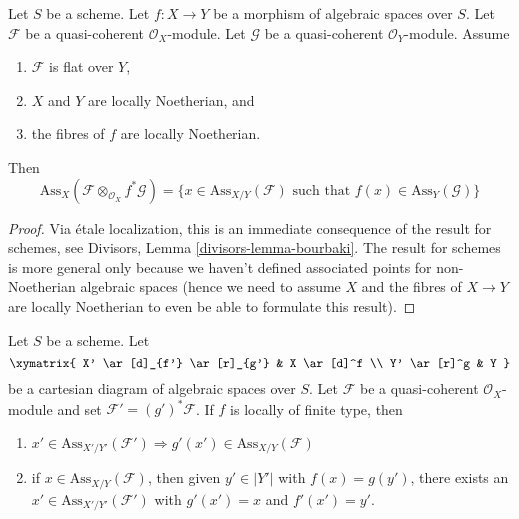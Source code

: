 \begin{lemma}
\label{lemma-bourbaki}
Let $S$ be a scheme.
Let $f : X \to Y$ be a morphism of algebraic spaces over $S$.
Let $\mathcal{F}$ be a quasi-coherent $\mathcal{O}_X$-module.
Let $\mathcal{G}$ be a quasi-coherent $\mathcal{O}_Y$-module.
Assume
\begin{enumerate}
\item $\mathcal{F}$ is flat over $Y$,
\item $X$ and $Y$ are locally Noetherian, and
\item the fibres of $f$ are locally Noetherian.
\end{enumerate}
Then
$$
\text{Ass}_X(\mathcal{F} \otimes_{\mathcal{O}_X} f^*\mathcal{G}) =
\{x \in \text{Ass}_{X/Y}(\mathcal{F})\text{ such that }
f(x) \in \text{Ass}_Y(\mathcal{G}) \}
$$
\end{lemma}

\begin{proof}
Via \'etale localization, this is an immediate consequence of the result
for schemes, see
Divisors, Lemma \ref{divisors-lemma-bourbaki}.
The result for schemes is more general only because
we haven't defined associated points for
non-Noetherian algebraic spaces (hence we need to assume $X$
and the fibres of $X \to Y$ are locally Noetherian to even
be able to formulate this result).
\end{proof}

\begin{lemma}
\label{lemma-base-change-relative-assassin}
Let $S$ be a scheme. Let
$$
\xymatrix{
X' \ar[d]_{f'} \ar[r]_{g'} & X \ar[d]^f \\
Y' \ar[r]^g & Y
}
$$
be a cartesian diagram of algebraic spaces over $S$.
Let $\mathcal{F}$ be a quasi-coherent $\mathcal{O}_X$-module
and set $\mathcal{F}' = (g')^*\mathcal{F}$.
If $f$ is locally of finite type, then
\begin{enumerate}
\item $x' \in \text{Ass}_{X'/Y'}(\mathcal{F}')
\Rightarrow g'(x') \in \text{Ass}_{X/Y}(\mathcal{F})$
\item if $x \in \text{Ass}_{X/Y}(\mathcal{F})$, then given
$y' \in |Y'|$ with $f(x) = g(y')$, there exists an
$x' \in \text{Ass}_{X'/Y'}(\mathcal{F}')$
with $g'(x') = x$ and $f'(x') = y'$.
\end{enumerate}
\end{lemma}

